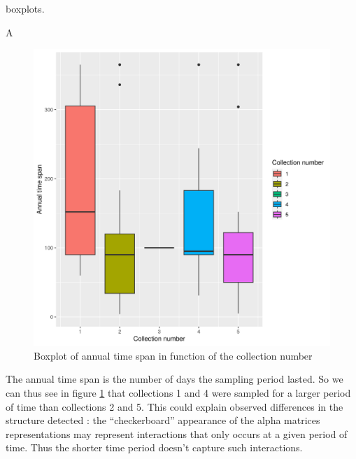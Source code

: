 boxplots.

A

\begin{figure}
\centering
\includegraphics{./img/de77b630fb66744d3a3ed68e45be765532d1eb0f.png}
\caption{\label{fig:boxplot-annual-time-span}Boxplot of annual time span
in function of the collection number}
\end{figure}

The annual time span is the number of days the sampling period lasted.
So we can thus see in figure \ref{fig:boxplot-annual-time-span} that
collections 1 and 4 were sampled for a larger period of time than
collections 2 and 5. This could explain observed differences in the
structure detected : the ``checkerboard'' appearance of the alpha
matrices representations may represent interactions that only occurs at
a given period of time. Thus the shorter time period doesn't capture
such interactions.

